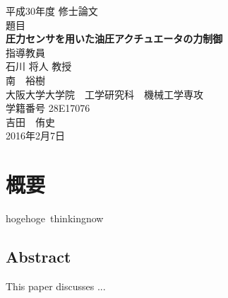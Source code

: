 \begin{titlepage}
\centering
\vspace*{40truept}
{\Large 平成30年度 修士論文} \\ %
\vspace{40truept} 
 {\Large 題目} \\
 \vspace{10truept} 
{\LARGE \textbf{圧力センサを用いた油圧アクチュエータの力制御}}\\ %
\vspace{10truept}
\vspace{120truept}
{\Large 指導教員}\\ %
 \vspace{10truept} 
{\Large 石川 将人 教授\\南　裕樹}\\ %
\vspace{60truept}
{\Large 大阪大学大学院　工学研究科　機械工学専攻}\\ %
 \vspace{10truept} 
{\Large 学籍番号 28E17076}\\ %
\vspace{20truept}
{\LARGE 吉田　侑史}\\ %
\vspace{80truept}
{\Large 2016年2月7日} %
\end{titlepage}
\cleardoublepage
\chapter*{\huge 概要}
\Cvs

hogehoge~thinkingnow


\section*{\huge Abstract}
\Cvs
This paper discusses ...
%
%


\newpage

\tableofcontents   %
\thispagestyle{plain}
\listoffigures %
\listoftables %

